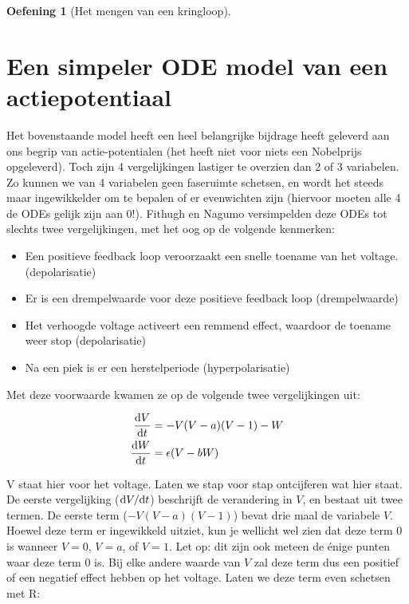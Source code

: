 \documentclass[
  a4paper,
]{scrbook}
\providecommand{\tightlist}{%
  \setlength{\itemsep}{0pt}\setlength{\parskip}{0pt}}\usepackage{longtable,booktabs,array}
\theoremstyle{definition}
\newtheorem{exercise}{Oefening}[chapter]
\theoremstyle{remark}
\begin{document}
\begin{exercise}[Het mengen van een
kringloop]
\section{Een simpeler ODE model van een
actiepotentiaal}\label{een-simpeler-ode-model-van-een-actiepotentiaal}

Het bovenstaande model heeft een heel belangrijke bijdrage heeft
geleverd aan ons begrip van actie-potentialen (het heeft niet voor niets
een Nobelprijs opgeleverd). Toch zijn 4 vergelijkingen lastiger te
overzien dan 2 of 3 variabelen. Zo kunnen we van 4 variabelen geen
faseruimte schetsen, en wordt het steeds maar ingewikkelder om te
bepalen of er evenwichten zijn (hiervoor moeten alle 4 de ODEs gelijk
zijn aan 0!). Fithugh en Nagumo versimpelden deze ODEs tot slechts twee
vergelijkingen, met het oog op de volgende kenmerken:

\begin{itemize}
\tightlist
\item
  Een positieve feedback loop veroorzaakt een snelle toename van het
  voltage. (depolarisatie)
\item
  Er is een drempelwaarde voor deze positieve feedback loop
  (drempelwaarde)
\item
  Het verhoogde voltage activeert een remmend effect, waardoor de
  toename weer stop (depolarisatie)
\item
  Na een piek is er een herstelperiode (hyperpolarisatie)
\end{itemize}

Met deze voorwaarde kwamen ze op de volgende twee vergelijkingen uit:

\begin{align}
    \mathchoice{\frac{\mathrm{d}V}
{\mathrm{d}t}}{\mathrm{d}V/\mathrm{d}t}
{\mathrm{d}V/\mathrm{d}t}
{\mathrm{d}V/\mathrm{d}t}&=-V(V-a)(V-1)-W \\
    \mathchoice{\frac{\mathrm{d}W}
{\mathrm{d}t}}{\mathrm{d}W/\mathrm{d}t}
{\mathrm{d}W/\mathrm{d}t}
{\mathrm{d}W/\mathrm{d}t}&=\epsilon(V-bW)
\end{align}

V staat hier voor het voltage. Laten we stap voor stap ontcijferen wat
hier staat. De eerste vergelijking (\(\mathchoice{\frac{\mathrm{d}V}
{\mathrm{d}t}}{\mathrm{d}V/\mathrm{d}t}
{\mathrm{d}V/\mathrm{d}t}
{\mathrm{d}V/\mathrm{d}t}\)) beschrijft de verandering in \(V\), en
bestaat uit twee termen. De eerste term (\(-V(V-a)(V-1)\)) bevat drie
maal de variabele \(V\). Hoewel deze term er ingewikkeld uitziet, kun je
wellicht wel zien dat deze term 0 is wanneer \(V=0\), \(V=a\), of
\(V=1\). Let op: dit zijn ook meteen de énige punten waar deze term 0
is. Bij elke andere waarde van \(V\) zal deze term dus een positief of
een negatief effect hebben op het voltage. Laten we deze term even
schetsen met R:


\end{exercise}
\end{document}
